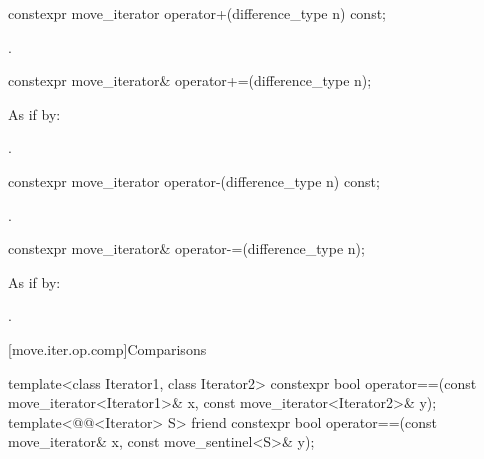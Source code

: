 %
\begin{itemdecl}
constexpr move_iterator operator+(difference_type n) const;
\end{itemdecl}

\begin{itemdescr}
\pnum
\returns
{}.
\end{itemdescr}

%
\begin{itemdecl}
constexpr move_iterator& operator+=(difference_type n);
\end{itemdecl}

\begin{itemdescr}
\pnum
\effects
As if by: 

\pnum
\returns
{}.
\end{itemdescr}

%
\begin{itemdecl}
constexpr move_iterator operator-(difference_type n) const;
\end{itemdecl}

\begin{itemdescr}
\pnum
\returns
{}.
\end{itemdescr}

%
\begin{itemdecl}
constexpr move_iterator& operator-=(difference_type n);
\end{itemdecl}

\begin{itemdescr}
\pnum
\effects
As if by: 

\pnum
\returns
{}.
\end{itemdescr}

[move.iter.op.comp]{Comparisons}

%
\begin{itemdecl}
template<class Iterator1, class Iterator2>
  constexpr bool operator==(const move_iterator<Iterator1>& x,
                            const move_iterator<Iterator2>& y);
template<@@<Iterator> S>
  friend constexpr bool operator==(const move_iterator& x,
                                   const move_sentinel<S>& y);
\end{itemdecl}

